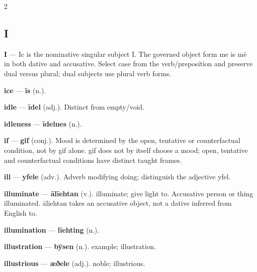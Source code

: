 \begin{multicols}{2}
\subsection*{I}
\textbf{I} — Ic is the nominative singular subject I. The governed object form me is mē in both dative and accusative. Select case from the verb/preposition and preserve dual versus plural; dual subjects use plural verb forms.\par
\textbf{ice} — \textbf{īs} (n.).\par
\textbf{idle} — \textbf{īdel} (adj.). Distinct from empty/void.\par
\textbf{idleness} — \textbf{īdelnes} (n.).\par
\textbf{if} — \textbf{gif} (conj.). Mood is determined by the open, tentative or counterfactual condition, not by gif alone. gif does not by itself choose a mood; open, tentative and counterfactual conditions have distinct taught frames.\par
\textbf{ill} — \textbf{yfele} (adv.). Adverb modifying doing; distinguish the adjective yfel.\par
\textbf{illuminate} — \textbf{ālīehtan} (v.). illuminate; give light to. Accusative person or thing illuminated. ālīehtan takes an accusative object, not a dative inferred from English to.\par
\textbf{illumination} — \textbf{līehting} (n.).\par
\textbf{illustration} — \textbf{bȳsen} (n.). example; illustration.\par
\textbf{illustrious} — \textbf{æðele} (adj.). noble; illustrious.\par

\end{multicols}
